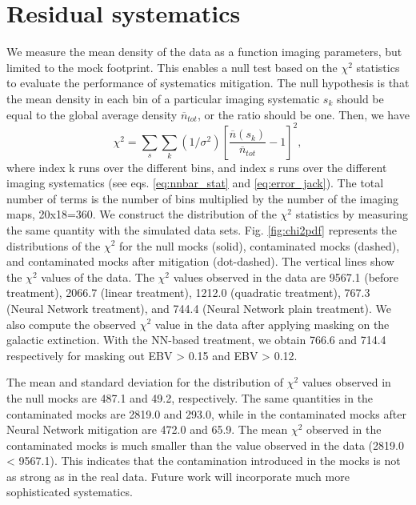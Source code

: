 \section{Residual systematics}
We measure the mean density of the data as a function imaging parameters, but limited to the mock footprint. This enables a null test based on the $\chi^{2}$ statistics to evaluate the performance of systematics mitigation. The null hypothesis is that the mean density in each bin of a particular imaging systematic $s_{k}$ should be equal to the global average density $\overline{n}_{tot}$, or the ratio should be one. Then, we have 
\begin{equation}\label{eq:chi2nnbar}
    \chi^{2} = \sum_{s}\sum_{k} (1/\sigma^{2})[\frac{\overline{n}(s_{k})}{\overline{n}_{tot}}-1]^{2},
\end{equation}
where index k runs over the different bins, and index s runs over the different imaging systematics (see eqs. \ref{eq:nnbar_stat} and \ref{eq:error_jack}). The total number of terms is the number of bins multiplied by the number of the imaging maps, 20x18=360. We construct the distribution of the $\chi^{2}$ statistics by measuring the same quantity with the simulated data sets. Fig. \ref{fig:chi2pdf} represents the distributions of the $\chi^{2}$ for the null mocks (solid), contaminated mocks (dashed), and contaminated mocks after mitigation (dot-dashed). The vertical lines show the $\chi^{2}$ values of the data. The $\chi^{2}$ values observed in the data are 9567.1 (before treatment), 2066.7 (linear treatment), 1212.0 (quadratic treatment), 767.3 (Neural Network treatment), and 744.4 (Neural Network plain treatment). We also compute the observed $\chi^{2}$ value in the data after applying masking on the galactic extinction. With the NN-based treatment, we obtain 766.6 and 714.4 respectively for masking out EBV > 0.15 and EBV > 0.12.

The mean and standard deviation for the distribution of $\chi^{2}$  values observed in the null mocks are 487.1 and 49.2, respectively. The same quantities in the contaminated mocks are 2819.0 and 293.0, while in the contaminated mocks after Neural Network mitigation are 472.0 and 65.9. The mean $\chi^{2}$ observed in the contaminated mocks is much smaller than the value observed in the data (2819.0 < 9567.1). This indicates that the contamination introduced in the mocks is not as strong as in the real data. Future work will incorporate much more sophisticated systematics. 


